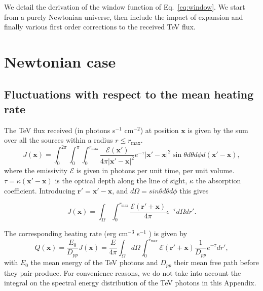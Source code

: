 \documentclass[twocolumns]{emulateapj}
\begin{document}
\appendix

We detail the derivation of the window function of Eq.~\eqref{eq:window}. We start from a purely Newtonian universe, then include the impact of expansion and finally various first order corrections to the received TeV flux.
\section {Newtonian case}\label{sec:windon_newt}

\subsection {Fluctuations with respect to the mean heating rate}

The TeV flux received (in photons s$^{-1}$ cm$^{-2}$) at position $\mathbf{x}$ is given by the sum over all the sources within a radius $r\leqslant r_{\mathrm{max}}$.
\begin{equation}
  \label{eq:flux_recu0}
  J(\mathbf{x})=\int_{0}^{2\pi}\int_{0}^{\pi}\int_0^{r_{\mathrm{max}}}   \frac{\mathcal{E}(\mathbf{x}') }{4\pi |\mathbf{x}'-\mathbf{x}|^2} e^{-\tau} |\mathbf{x}'-\mathbf{x}|^2 \sin\theta d\theta d\phi d(\mathbf{x}'-\mathbf{x}),
\end{equation}
where the emissivity $\mathcal{E}$ is given in photons per unit time, per unit volume. $\tau=\kappa (\mathbf{x}'-\mathbf{x})$ is the optical depth along the line of sight, $\kappa$ the absorption coefficient.
Introducing $\mathbf{r'}=\mathbf{x}'-\mathbf{x}$, and $d\Omega=sin\theta d\theta d\phi$ this gives


\begin{equation}
  \label{eq:flux_recu}
  J(\mathbf{x})=\int_{\Omega}\int_0^{r_{\mathrm{max}}}   \frac{\mathcal{E}(\mathbf{r}'+\mathbf{x}) }{4\pi } e^{-\tau} d\Omega dr'.
\end{equation}

The corresponding heating rate (erg cm$^{-3}$ s$^{-1}$ ) is given by 
\begin{equation}
  \label{eq:heating_rate0}
  \dot{Q}(\mathbf{x})=\frac{E_0}{D_{pp}}J(\mathbf{x}) =\frac{E}{4\pi}   \int_{\Omega}d\Omega\int_0^{r_{\mathrm{max}}}   \mathcal{E}(\mathbf{r}'+\mathbf{x}) \frac{1}{D_{pp}}  e^{-\tau} dr' ,
\end{equation}
with $E_0$ the mean energy of the TeV photons and $D_{pp}$ their mean free path  before they pair-produce. For convenience reasons,  we  do not take into account the integral on the spectral energy distribution of the TeV photons in this Appendix. 
\end{document}
